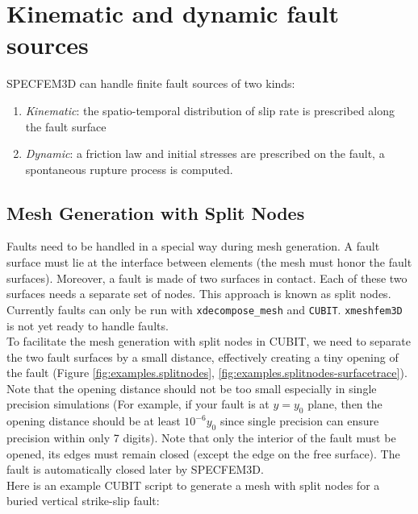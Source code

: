 \chapter{Kinematic and dynamic fault sources}\label{cha:Fault-Kinematics-Dynamics}

SPECFEM3D can handle finite fault sources of two kinds:
\begin{enumerate}
\item \emph{Kinematic}: the spatio-temporal distribution of slip rate is
prescribed along the fault surface
\item \emph{Dynamic}: a friction law and initial stresses are prescribed
on the fault, a spontaneous rupture process is computed.
\end{enumerate}

\section{Mesh Generation with Split Nodes}\label{sec:Mesh-Generation-with}

Faults need to be handled in a special way during mesh generation.
A fault surface must lie at the interface between elements (the mesh
must honor the fault surfaces). Moreover, a fault is made of two surfaces
in contact. Each of these two surfaces needs a separate set of nodes.
This approach is known as \textquotedbl{}split nodes\textquotedbl{}.
Currently faults can only be run with \texttt{xdecompose\_mesh} and
\texttt{CUBIT}. \texttt{xmeshfem3D} is not yet ready to handle faults.\\


To facilitate the mesh generation with split nodes in CUBIT, we need
to separate the two fault surfaces by a small distance, effectively
creating a tiny opening of the fault (Figure \ref{fig:examples.splitnodes},
\ref{fig:examples.splitnodes-surfacetrace}). Note that the opening distance
should not be too small especially in single precision simulations
(For example, if your fault is at $y=y_0$ plane, then the opening distance
should be at least $10^{-6}y_0$ since single precision can ensure precision
within only 7 digits). Note that only the interior
of the fault must be opened, its edges must remain closed (except
the edge on the free surface). The fault is automatically closed later
by SPECFEM3D.\\

\noindent
Here is an example CUBIT script to generate a mesh with split nodes
for a buried vertical strike-slip fault:

